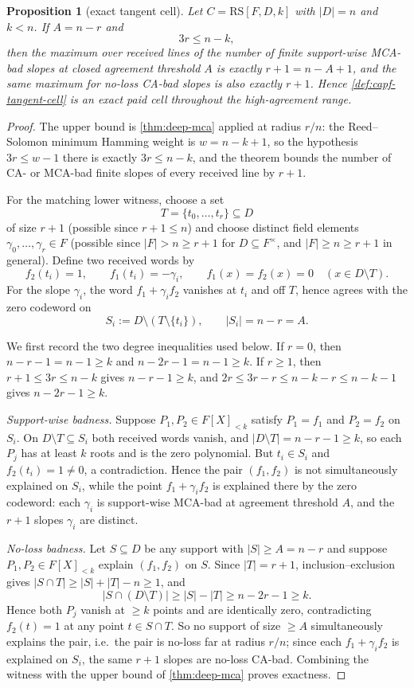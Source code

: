 \documentclass[11pt]{article}
\newtheorem{proposition}[proposition]{Proposition}
\theoremstyle{definition}
\theoremstyle{remark}
\newcommand{\RS}{\mathrm{RS}}
\begin{document}
\begin{proposition}[exact tangent cell]\label{prop:capf-tangent}
Let $C=\RS[F,D,k]$ with $|D|=n$ and $k<n$.  If $A=n-r$ and
\[
        3r\le n-k,
\]
then the maximum over received lines of the number of finite support-wise MCA-bad slopes at closed agreement threshold $A$ is exactly $r+1=n-A+1$, and the same maximum for no-loss CA-bad slopes is also exactly $r+1$.  Hence \cref{def:capf-tangent-cell} is an exact paid cell throughout the high-agreement range.
\end{proposition}

\begin{proof}
The upper bound is \cref{thm:deep-mca} applied at radius $r/n$: the Reed--Solomon minimum Hamming weight is $w=n-k+1$, so the hypothesis $3r\le w-1$ there is exactly $3r\le n-k$, and the theorem bounds the number of CA- or MCA-bad finite slopes of every received line by $r+1$.

For the matching lower witness, choose a set
\[
        T=\{t_0,\ldots,t_r\}\subseteq D
\]
of size $r+1$ \textup{(possible since $r+1\le n$)} and choose distinct field elements $\gamma_0,\ldots,\gamma_r\in F$ \textup{(possible since $|F|>n\ge r+1$ for $D\subseteq F^\times$, and $|F|\ge n\ge r+1$ in general)}.  Define two received words by
\[
        f_2(t_i)=1,
        \qquad
        f_1(t_i)=-\gamma_i,
        \qquad
        f_1(x)=f_2(x)=0\quad (x\in D\setminus T).
\]
For the slope $\gamma_i$, the word $f_1+\gamma_i f_2$ vanishes at $t_i$ and off $T$, hence agrees with the zero codeword on
\[
        S_i:=D\setminus (T\setminus\{t_i\}),
        \qquad |S_i|=n-r=A .
\]

We first record the two degree inequalities used below.  If $r=0$, then $n-r-1=n-1\ge k$ and $n-2r-1=n-1\ge k$.  If $r\ge1$, then $r+1\le 3r\le n-k$ gives $n-r-1\ge k$, and $2r\le 3r-r\le n-k-r\le n-k-1$ gives $n-2r-1\ge k$.

\emph{Support-wise badness.}  Suppose $P_1,P_2\in F[X]_{<k}$ satisfy $P_1=f_1$ and $P_2=f_2$ on $S_i$.  On $D\setminus T\subseteq S_i$ both received words vanish, and $|D\setminus T|=n-r-1\ge k$, so each $P_j$ has at least $k$ roots and is the zero polynomial.  But $t_i\in S_i$ and $f_2(t_i)=1\ne0$, a contradiction.  Hence the pair $(f_1,f_2)$ is not simultaneously explained on $S_i$, while the point $f_1+\gamma_i f_2$ is explained there by the zero codeword: each $\gamma_i$ is support-wise MCA-bad at agreement threshold $A$, and the $r+1$ slopes $\gamma_i$ are distinct.

\emph{No-loss badness.}  Let $S\subseteq D$ be any support with $|S|\ge A=n-r$ and suppose $P_1,P_2\in F[X]_{<k}$ explain $(f_1,f_2)$ on $S$.  Since $|T|=r+1$, inclusion--exclusion gives $|S\cap T|\ge|S|+|T|-n\ge1$, and
\[
        |S\cap(D\setminus T)|\ge |S|-|T|\ge n-2r-1\ge k .
\]
Hence both $P_j$ vanish at $\ge k$ points and are identically zero, contradicting $f_2(t)=1$ at any point $t\in S\cap T$.  So no support of size $\ge A$ simultaneously explains the pair, i.e.\ the pair is no-loss far at radius $r/n$; since each $f_1+\gamma_if_2$ is explained on $S_i$, the same $r+1$ slopes are no-loss CA-bad.  Combining the witness with the upper bound of \cref{thm:deep-mca} proves exactness.
\end{proof}
\end{document}
